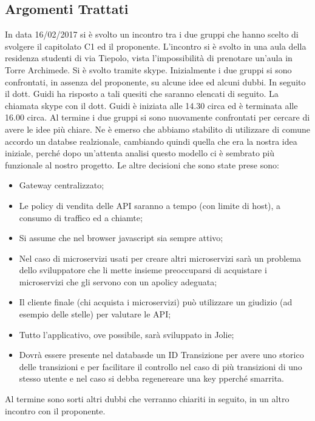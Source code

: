 \documentclass[12pt,a4paper,titlepage]{article}
\begin{document}
\subsection{Argomenti Trattati}
In data 16/02/2017 si è svolto un incontro tra i due gruppi che hanno scelto di svolgere il capitolato C1 ed il proponente. L'incontro si è svolto in una aula della residenza studenti di via Tiepolo, vista l'impossibilità di prenotare un'aula in Torre Archimede.
Si è svolto tramite skype. Inizialmente i due gruppi si sono confrontati, in assenza del proponente, su alcune idee ed alcuni dubbi. In seguito il dott. Guidi ha risposto a tali quesiti che saranno elencati di seguito. La chiamata skype con il dott. Guidi è iniziata alle 14.30 circa ed è terminata alle 16.00 circa. Al termine i due gruppi si sono nuovamente confrontati per cercare di avere le idee più chiare. Ne è emerso che abbiamo stabilito di utilizzare di comune accordo un databse realzionale, cambiando quindi quella che era la nostra idea  iniziale, perché dopo un'attenta analisi questo modello ci è sembrato più funzionale al nostro progetto. Le altre decisioni che sono state prese sono:
\begin{itemize}
	\item Gateway centralizzato;
	\item Le policy di vendita delle API saranno a tempo (con limite di host), a consumo di traffico ed a chiamte;
	\item Si assume che nel browser javascript sia sempre attivo;
	\item Nel caso di microservizi usati per creare altri microservizi sarà un problema dello sviluppatore che li mette insieme preoccuparsi di acquistare i microservizi che gli servono con un apolicy adeguata;
	\item Il cliente finale (chi acquista i microservizi) può utilizzare un giudizio (ad esempio delle stelle) per valutare le API;
	\item Tutto l'applicativo, ove possibile, sarà sviluppato in Jolie;
	\item Dovrà essere presente nel databasde un ID Transizione per avere uno storico delle transizioni e per facilitare il controllo nel caso di più transizioni di uno stesso utente e nel caso si debba regenereare una key pperché smarrita.
\end{itemize}
Al termine sono sorti altri dubbi che verranno chiariti in seguito, in un altro incontro con il proponente.
\end{document}
